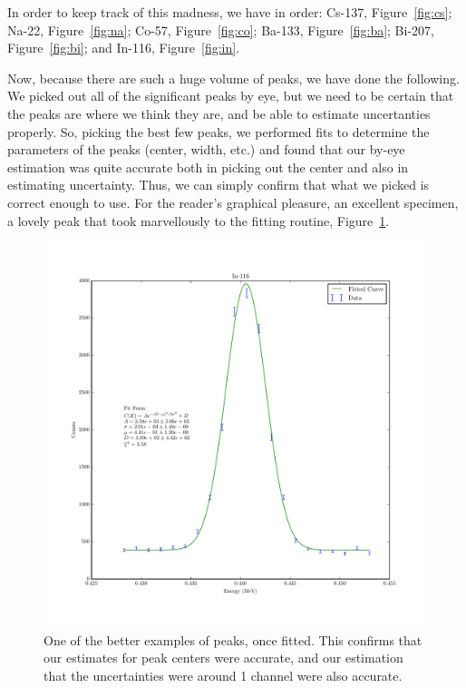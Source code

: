 \documentclass[reprint, nobibnotes, amssymb, amsmath, amsfonts, physics, mathtools, mathrsfs, floatfix]{revtex4-1}
\begin{document}
      In order to keep track of this madness, we have in order: Cs-137, Figure~\ref{fig:cs}; Na-22, Figure~\ref{fig:na}; Co-57, Figure~\ref{fig:co}; Ba-133, Figure~\ref{fig:ba}; Bi-207, Figure~\ref{fig:bi}; and In-116, Figure~\ref{fig:in}.

      \hspace{.25cm}

      Now, because there are such a huge volume of peaks, we have done the following.  We picked out all of the significant peaks by eye, but we need to be certain that the peaks are where we think they are, and be able to estimate uncertanties properly.  So, picking the best few peaks, we performed fits to determine the parameters of the peaks (center, width, etc.) and found that our by-eye estimation was quite accurate both in picking out the center and also in estimating uncertainty.  Thus, we can simply confirm that what we picked is correct enough to use.  For the reader's graphical pleasure, an excellent specimen, a lovely peak that took marvellously to the fitting routine, Figure~\ref{fig:fitted_in}.

      \begin{figure}[h]
        \centering
        \includegraphics[width=\linewidth]{../plots/In-116_0_4405.pdf}
        \caption{One of the better examples of peaks, once fitted.  This confirms that our estimates for peak centers were accurate, and our estimation that the uncertainties were around 1 channel were also accurate. \label{fig:fitted_in}}
      \end{figure}








\end{document}
